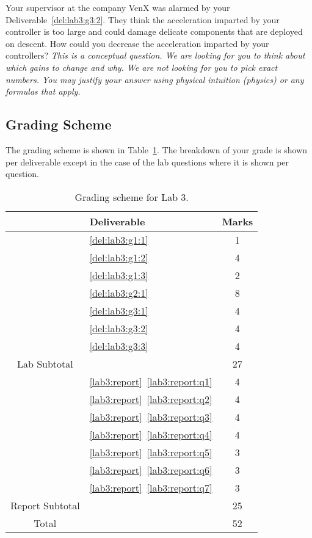 \begin{deliverable}[label={lab3:report}]
\begin{enumerate}[label={(\arabic*)}]
{      Your supervisor at the company VenX was alarmed by your Deliverable~\ref{del:lab3:g3:2}.
      They think the acceleration imparted by your controller is too large and could damage delicate components that are deployed on descent.
      How could you decrease the acceleration imparted by your controllers?
      \emph{This is a conceptual question.
      We are looking for you to think about which gains to change and why.
      We are not looking for you to pick exact numbers.
      You may justify your answer using physical intuition (physics) or any formulas that apply.}
      \label{lab3:report:q7}
    }
  \end{enumerate}
\end{deliverable}


\subsection{Grading Scheme}
The grading scheme is shown in Table~\ref{tab:lab3:grading}. The breakdown of
your grade is shown per deliverable except in the case of the lab
questions where it is shown per question.
%
\begin{table}[H]
\centering
\caption[Grading Scheme for Lab 3]{Grading scheme for Lab 3.}
\label{tab:lab3:grading}
\begin{tabular}{c|l|c}
        & Deliverable           & Marks  \\ \hline
        & \ref{del:lab3:g1:1}         & 1       \\ \hline
        & \ref{del:lab3:g1:2}         & 4      \\ \hline
        & \ref{del:lab3:g1:3}        & 2       \\ \hline
        & \ref{del:lab3:g2:1}        & 8       \\ \hline
        & \ref{del:lab3:g3:1}         & 4      \\ \hline
        & \ref{del:lab3:g3:2}         & 4       \\ \hline
        & \ref{del:lab3:g3:3}         & 4       \\ \hhline{=|=|=}
Lab Subtotal&                       & 27      \\ \hhline{=|=|=}
        & \ref{lab3:report}~\ref{lab3:report:q1}  & 4       \\ \hline
        & \ref{lab3:report}~\ref{lab3:report:q2}  & 4       \\ \hline
        & \ref{lab3:report}~\ref{lab3:report:q3}  & 4       \\ \hline
        & \ref{lab3:report}~\ref{lab3:report:q4}  & 4       \\ \hline
        & \ref{lab3:report}~\ref{lab3:report:q5}  & 3      \\ \hline
        & \ref{lab3:report}~\ref{lab3:report:q6}  & 3      \\ \hline
        & \ref{lab3:report}~\ref{lab3:report:q7}  & 3      \\ \hhline{=|=|=}
Report Subtotal&  & 25 \\ \hhline{=|=|=}
  Total &                       & 52
\end{tabular}
\end{table}
%
